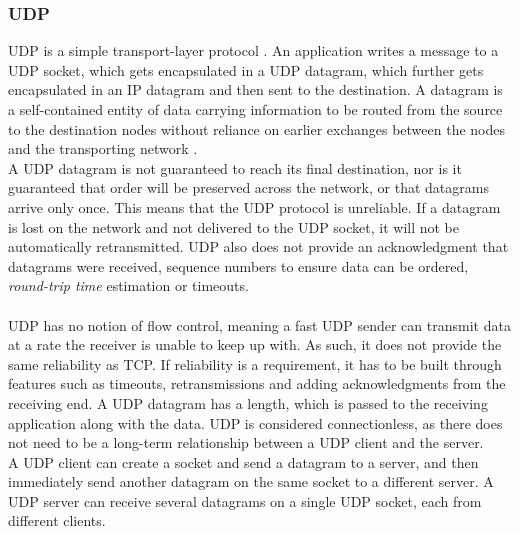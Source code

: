 \subsubsection{UDP}
UDP is a simple transport-layer protocol \cite{socketnetworking}.
An application writes a message to a UDP socket, which gets encapsulated in a UDP datagram, which further gets encapsulated in an IP datagram and then sent to the destination.
A datagram is a self-contained entity of data carrying information to be routed from the source to the destination nodes without reliance on earlier exchanges between the nodes and the transporting network \cite{hpbrowsernetworking}.\\
A UDP datagram is not guaranteed to reach its final destination, nor is it guaranteed that order will be preserved across the network, or that datagrams arrive only once.
This means that the UDP protocol is unreliable.
If a datagram is lost on the network and not delivered to the UDP socket, it will not be automatically retransmitted.
UDP also does not provide an acknowledgment that datagrams were received, sequence numbers to ensure data can be ordered, \textit{round-trip time} estimation or timeouts.\\\\
UDP has no notion of flow control, meaning a fast UDP sender can transmit data at a rate the receiver is unable to keep up with.
As such, it does not provide the same reliability as TCP.
If reliability is a requirement, it has to be built through features such as timeouts, retransmissions and adding acknowledgments from the receiving end.
A UDP datagram has a length, which is passed to the receiving application along with the data.
UDP is considered connectionless, as there does not need to be a long-term relationship between a UDP client and the server.\\
A UDP client can create a socket and send a datagram to a server, and then immediately send another datagram on the same socket to a different server.
A UDP server can receive several datagrams on a single UDP socket, each from different clients.



